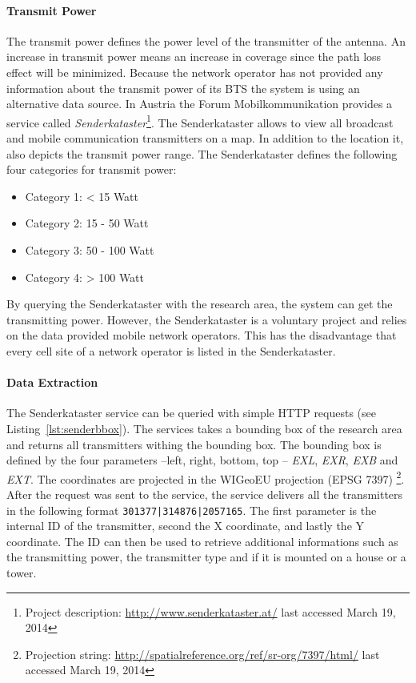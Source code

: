 \paragraph{Transmit Power}
The transmit power defines the power level of the transmitter of the antenna. An increase in transmit power means an increase in coverage since the path loss effect will be minimized. Because the network operator has not provided any information about the transmit power of its BTS the system is using an alternative data source. In Austria the Forum Mobilkommunikation provides a service called \emph{Senderkataster}\footnote{Project description: \url{http://www.senderkataster.at/} last accessed March 19, 2014}. The Senderkataster allows to view all broadcast and mobile communication transmitters on a map. In addition to the location it, also depicts the transmit power range. The Senderkataster defines the following four categories for transmit power:
\begin{itemize}
	\item Category 1: < 15 Watt
	\item Category 2: 15 - 50 Watt
	\item Category 3: 50 - 100 Watt
	\item Category 4: > 100 Watt
\end{itemize}
By querying the Senderkataster with the research area, the system can get the transmitting power. However, the Senderkataster is a voluntary project and relies on the data provided mobile network operators. This has the disadvantage that every cell site of a network operator is listed in the Senderkataster.
\paragraph{Data Extraction}
The Senderkataster service can be queried with simple HTTP requests (see Listing~\ref{lst:senderbbox}). The services takes a bounding box of the research area and returns all transmitters withing the bounding box. The bounding box is defined by the four parameters --left, right, bottom, top -- \emph{EXL}, \emph{EXR}, \emph{EXB} and \emph{EXT}. The coordinates are projected in the WIGeoEU projection (EPSG 7397) \footnote{Projection string: \url{http://spatialreference.org/ref/sr-org/7397/html/} last accessed March 19, 2014}. After the request was sent to the service, the service delivers all the transmitters in the following format \lstinline+301377|314876|2057165+. The first parameter is the internal ID of the transmitter, second the X coordinate, and lastly the Y coordinate. The ID can then be used to retrieve additional informations such as the transmitting power, the transmitter type and if it is mounted on a house or a tower.

